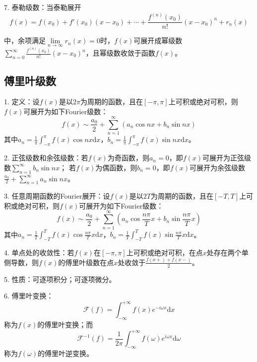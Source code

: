 7. 泰勒级数：当泰勒展开
\begin{equation*}
    f(x)=f(x_0)+f'(x_0)(x-x_0)+\cdots+\frac{f^{(n)}(x_0)}{n!}(x-x_0)^n+r_n(x)
\end{equation*}

中，余项满足$\lim\limits_{n\rightarrow\infty}r_n(x)=0$时，$f(x)$可展开成幂级数$\sum\limits_{n=0}^\infty\frac{f^{(n)}(x_0)}{n!}(x-x_0)^n$，且幂级数收敛于函数$f(x)$。

\subsection{傅里叶级数}

1. 定义：设$f(x)$是以$2\pi$为周期的函数，且在$[-\pi,\pi]$上可积或绝对可积，则$f(x)$可展开为如下Fourier级数：
\begin{equation*}
    f(x)\sim \frac{a_0}{2}+\sum\limits_{n=1}^\infty \left(a_n\cos nx+b_n\sin nx\right)
\end{equation*}
其中$a_n=\frac{1}{\pi}\int_{-\pi}^\pi f(x)\cos nx\mathrm{d}x$，$b_n=\frac{1}{\pi}\int_{-\pi}^\pi f(x)\sin nx\mathrm{d}x$。

2. 正弦级数和余弦级数：若$f(x)$为奇函数，则$a_n=0$，即$f(x)$可展开为正弦级数$\sum\limits_{n=1}^\infty b_n\sin nx$；
若$f(x)$为偶函数，则$b_n=0$，即$f(x)$可展开为余弦级数$\frac{a_0}{2}+\sum\limits_{n=1}^\infty a_n\sin nx$。

3. 任意周期函数的Fourier展开：设$f(x)$是以$2T$为周期的函数，且在$[-T,T]$上可积或绝对可积，则$f(x)$可展开为如下Fourier级数：
\begin{equation*}
    f(x)\sim \frac{a_0}{2}+\sum\limits_{n=1}^\infty \left(a_n\cos \frac{n\pi}{T}x+b_n\sin \frac{n\pi}{T}x\right)
\end{equation*}
其中$a_n=\frac{1}{T}\int_{-T}^T f(x)\cos \frac{n\pi}{T}x\mathrm{d}x$，$b_n=\frac{1}{T}\int_{-T}^T f(x)\sin \frac{n\pi}{T}x\mathrm{d}x$。

4. 单点处的收敛性：若$f(x)$在$[-\pi,\pi]$上可积或绝对可积，在点$x$处存在两个单侧导数，则$f(x)$的傅里叶级数在点$x$处收敛于$\frac{f(x+)+f(x-)}{2}$。

5. 性质：可逐项积分；可逐项微分。

6. 傅里叶变换：
\begin{equation*}
    \mathscr{F}(f)=\int_{-\infty}^{+\infty}f(x)e^{-i\omega x}\mathrm{d}x
\end{equation*}
称为$f(x)$的傅里叶变换；而
\begin{equation*}
    \mathscr{F}^{-1}(f)=\frac{1}{2\pi}\int_{-\infty}^{+\infty}f(\omega)e^{i\omega x}\mathrm{d}\omega
\end{equation*}
称为$f(\omega)$的傅里叶逆变换。

